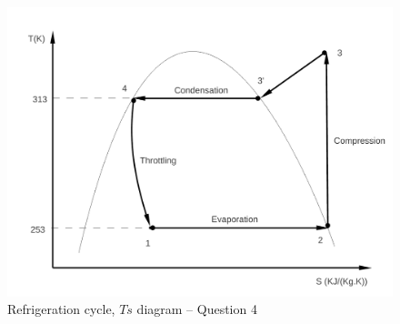 \documentclass[calculator,steamtables]{exam}
\begin{document}
\begin{question}
\begin{figure}[h]
\begin{center}
\includegraphics[width=10.cm,clip]{./Pics/Exam_Refrigeration1}
\caption{ Refrigeration cycle, $Ts$ diagram  -- Question 4}
\label{exam_refrig1}
\end{center}
\end{figure}


\end{question}

\clearpage
\end{document}
